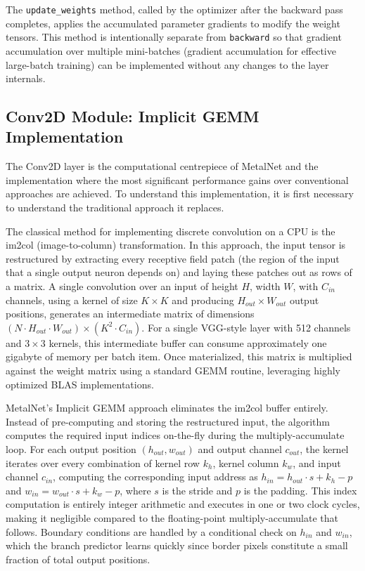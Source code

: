 \documentclass[12pt,oneside,a4paper]{report}
\begin{document}
The \texttt{update\_weights} method, called by the optimizer after the backward pass completes, applies the accumulated parameter gradients to modify the weight tensors. This method is intentionally separate from \texttt{backward} so that gradient accumulation over multiple mini-batches (gradient accumulation for effective large-batch training) can be implemented without any changes to the layer internals.

\subsection{Conv2D Module: Implicit GEMM Implementation}

The Conv2D layer is the computational centrepiece of MetalNet and the implementation where the most significant performance gains over conventional approaches are achieved. To understand this implementation, it is first necessary to understand the traditional approach it replaces.

The classical method for implementing discrete convolution on a CPU is the im2col (image-to-column) transformation. In this approach, the input tensor is restructured by extracting every receptive field patch (the region of the input that a single output neuron depends on) and laying these patches out as rows of a matrix. A single convolution over an input of height $H$, width $W$, with $C_{in}$ channels, using a kernel of size $K \times K$ and producing $H_{out} \times W_{out}$ output positions, generates an intermediate matrix of dimensions $(N \cdot H_{out} \cdot W_{out}) \times (K^2 \cdot C_{in})$. For a single VGG-style layer with 512 channels and $3 \times 3$ kernels, this intermediate buffer can consume approximately one gigabyte of memory per batch item. Once materialized, this matrix is multiplied against the weight matrix using a standard GEMM routine, leveraging highly optimized BLAS implementations.

MetalNet's Implicit GEMM approach eliminates the im2col buffer entirely. Instead of pre-computing and storing the restructured input, the algorithm computes the required input indices on-the-fly during the multiply-accumulate loop. For each output position $(h_{out}, w_{out})$ and output channel $c_{out}$, the kernel iterates over every combination of kernel row $k_h$, kernel column $k_w$, and input channel $c_{in}$, computing the corresponding input address as $h_{in} = h_{out} \cdot s + k_h - p$ and $w_{in} = w_{out} \cdot s + k_w - p$, where $s$ is the stride and $p$ is the padding. This index computation is entirely integer arithmetic and executes in one or two clock cycles, making it negligible compared to the floating-point multiply-accumulate that follows. Boundary conditions are handled by a conditional check on $h_{in}$ and $w_{in}$, which the branch predictor learns quickly since border pixels constitute a small fraction of total output positions.
\end{document}
